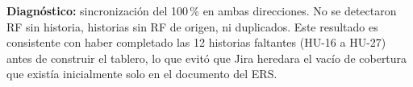 \documentclass[journal,onecolumn]{IEEEtran}
\begin{document}
\noindent\textbf{Diagnóstico:} sincronización del 100\,\% en ambas
direcciones. No se detectaron RF sin historia, historias sin RF de
origen, ni duplicados. Este resultado es consistente con haber
completado las 12 historias faltantes (HU-16 a HU-27) antes de construir
el tablero, lo que evitó que Jira heredara el vacío de cobertura que
existía inicialmente solo en el documento del ERS.

\newpage

\printbibliography[title={Referencias}]
\end{document}
